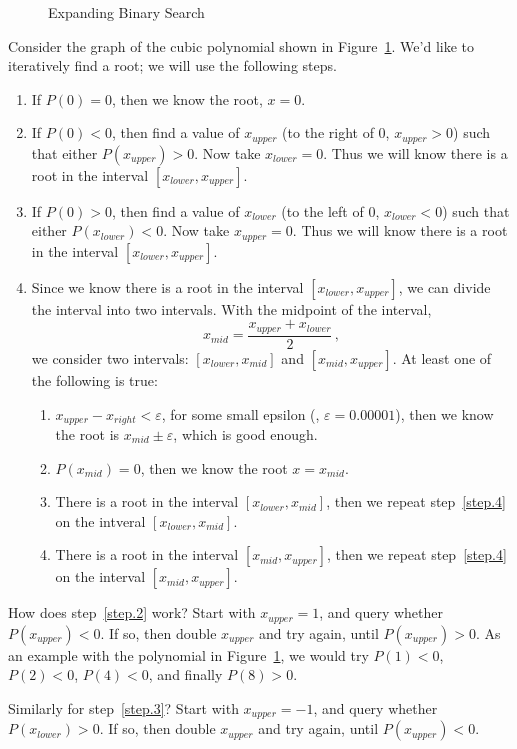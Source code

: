 \begin{figure}
  \centering

  \caption{Expanding Binary Search} 
  \label{fig.cubic.binary}
\end{figure}

Consider the graph of the cubic polynomial shown in Figure~\ref{fig.cubic.binary}.  We'd like to
iteratively find a root; we will use the following steps.

\begin{enumerate}
\item If $P(0)=0$, then we know the root, $x=0$.
\item \label{step.2} If $P(0)< 0$, then find a value of $x_{upper}$ (to the right of 0, $x_{upper}>0$) such that either $P(x_{upper})>0$.
  Now take $x_{lower}=0$.
  Thus we
  will know there is a root in the interval $[x_{lower}, x_{upper}]$.
\item \label{step.3} If $P(0)> 0$, then find a value of $x_{lower}$ (to the left of 0, $x_{lower}<0$) such that either $P(x_{lower})<0$. 
  Now take $x_{upper}=0$.
 Thus we
  will know there is a root in the interval $[x_{lower}, x_{upper}]$.
\item \label{step.4} Since we know there is a root in the interval
  $[x_{lower}, x_{upper}]$, we can divide the interval into two
  intervals.  With the midpoint of the interval, \[x_{mid} =
  \frac{x_{upper} + x_{lower}}{2}\,,\] we consider two intervals:
  $[x_{lower}, x_{mid}]$ and $[x_{mid}, x_{upper}]$.  At least one of
  the following is true:
  \begin{enumerate}
  \item $x_{upper} - x_{right} < \varepsilon$, for some small epsilon (\eg, $\varepsilon = 0.00001$),
    then we know the root is $x_{mid} \pm \varepsilon$, which is good enough.
  \item $P(x_{mid}) = 0$, then we know the root $x= x_{mid}$.
  \item There is a root in the interval $[x_{lower}, x_{mid}]$, then
    we repeat step~\ref{step.4} on the intveral $[x_{lower},
      x_{mid}]$.
  \item There is a root in the interval $[x_{mid}, x_{upper}]$, then
    we repeat step~\ref{step.4} on the interval $[x_{mid},
      x_{upper}]$.
  \end{enumerate}
\end{enumerate}


How does step~\ref{step.2} work?  Start with  $x_{upper}=1$, and query whether ${P(x_{upper}) < 0}$.
If so, then double $x_{upper}$ and try again, until ${P(x_{upper}) > 0}$.  As an example with the polynomial in Figure~\ref{fig.cubic.binary}, we would try ${P(1)< 0}$, ${P(2) < 0}$, ${P(4)<0}$, and finally ${P(8) > 0}$.

Similarly for step~\ref{step.3}?  Start with  $x_{upper}=-1$, and query whether ${P(x_{lower}) > 0}$.
If so, then double $x_{upper}$ and try again, until ${P(x_{upper}) < 0}$.

